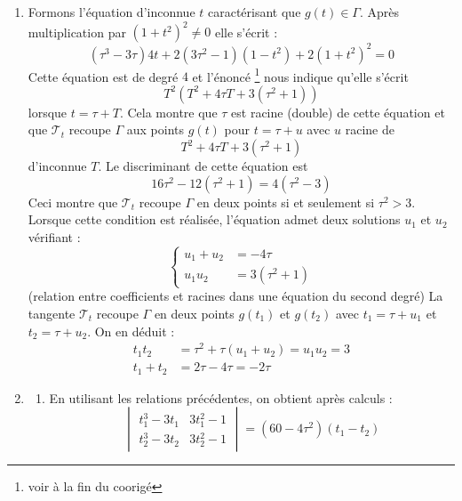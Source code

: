 \begin{enumerate}
\item Formons l'équation d'inconnue $t$ caractérisant que $g(t)\in\Gamma$. Après multiplication par $(1+t^2)^2\neq0$ elle s'écrit :
\begin{equation*}
 (\tau^3-3\tau)4t + 2(3\tau^2-1)(1-t^2)+ 2(1+t^2)^2 = 0
\end{equation*}
Cette équation est de degré $4$ et l'énoncé 
\footnote{voir à la fin du coorigé} nous indique qu'elle s'écrit
\begin{equation*}
 T^2\left( T^2+4\tau T +3(\tau^2 +1) \right)
\end{equation*}
lorsque $t=\tau+T$. Cela montre que $\tau$ est racine (double) de cette équation et que $\mathcal T_t$ recoupe $\Gamma$ aux points $g(t)$ pour $t=\tau + u$ avec $u$ racine de
\begin{equation*}
 T^2 +4\tau T +3(\tau^2+1)
\end{equation*}
d'inconnue $T$. Le discriminant de cette équation est
\begin{displaymath}
 16\tau^2 -12(\tau^2 +1) = 4(\tau^2 -3)
\end{displaymath}
Ceci montre que $\mathcal T_t$ recoupe $\Gamma$ en deux points si et seulement si $\tau^2 > 3$.
Lorsque cette condition est réalisée, l'équation admet deux solutions $u_1$ et $u_2$ vérifiant :
\begin{equation*}
\left\lbrace 
 \begin{aligned}
  u_1 + u_2 &= -4 \tau \\
 u_1u_2 &= 3(\tau^2 +1)
 \end{aligned}
\right. 
\end{equation*}
(relation entre coefficients et racines dans une équation du second degré) \newline
La tangente $\mathcal T_t$ recoupe $\Gamma$ en deux points $g(t_1)$ et $g(t_2)$ avec $t_1=\tau +u_1$ et $t_2=\tau +u_2$. On en déduit :
\begin{align*}
 t_1t_2 &= \tau^2 + \tau(u_1+u_2) = u_1u_2 = 3 \\
 t_1 + t_2 &= 2\tau -4\tau = -2 \tau
\end{align*}

\item \begin{enumerate}
 \item En utilisant les relations précédentes, on obtient après calculs :
\begin{equation*}
 \begin{vmatrix}
    t_1^3-3t_1 & 3t_1^2-1 \\
    t_2^3-3t_2 & 3t_2^2-1
 \end{vmatrix}
 = (60-4\tau^2)(t_1 -t_2)
\end{equation*}


\end{enumerate}
\end{enumerate}
